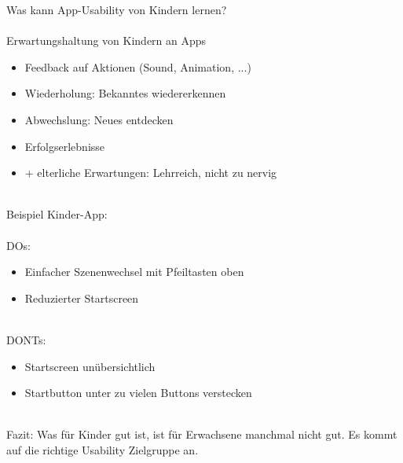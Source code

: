 \documentclass[a4paper]{article}
\begin{document}
Was kann App-Usability von Kindern lernen?\\~\\
Erwartungshaltung von Kindern an Apps
\begin{itemize}
	\item Feedback auf Aktionen (Sound, Animation, ...)
	\item Wiederholung: Bekanntes wiedererkennen
	\item Abwechslung: Neues entdecken
	\item Erfolgserlebnisse
	\item + elterliche Erwartungen: Lehrreich, nicht zu nervig
\end{itemize}
~\\
Beispiel Kinder-App:\\
~\\
DOs:
\begin{itemize}
	\item Einfacher Szenenwechsel mit Pfeiltasten oben
	\item Reduzierter Startscreen
\end{itemize}
~\\
DONTs:
\begin{itemize}
	\item Startscreen unübersichtlich
	\item Startbutton unter zu vielen Buttons verstecken
\end{itemize}
~\\
Fazit: Was für Kinder gut ist, ist für Erwachsene manchmal nicht gut. Es kommt auf die richtige Usability Zielgruppe an.
\end{document}
